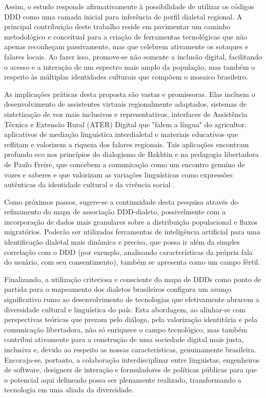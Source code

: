 Assim, o estudo responde afirmativamente à possibilidade de utilizar os códigos DDD como uma camada inicial para inferência de perfil dialetal regional. A principal contribuição deste trabalho reside em pavimentar um caminho metodológico e conceitual para a criação de ferramentas tecnológicas que não apenas reconheçam passivamente, mas que celebrem ativamente os sotaques e falares locais. Ao fazer isso, promove-se não somente a inclusão digital, facilitando o acesso e a interação de um espectro mais amplo da população, mas também o respeito às múltiplas identidades culturais que compõem o mosaico brasileiro.

As implicações práticas desta proposta são vastas e promissoras. Elas incluem o desenvolvimento de assistentes virtuais regionalmente adaptados, sistemas de sintetização de voz mais inclusivos e representativos, interfaces de Assistência Técnica e Extensão Rural (ATER) Digital que "falem a língua" do agricultor, aplicativos de mediação linguística interdialetal e materiais educativos que reflitam e valorizem a riqueza dos falares regionais. Tais aplicações encontram profundo eco nos princípios do dialogismo de Bakhtin e na pedagogia libertadora de Paulo Freire, que concebem a comunicação como um encontro genuíno de vozes e saberes e que valorizam as variações linguísticas como expressões autênticas da identidade cultural e da vivência social \cite{bakhtin1997estetica, freire2005pedagogia, freire2013extensao}.

Como próximos passos, sugere-se a continuidade desta pesquisa através do refinamento do mapa de associação DDD-dialeto, possivelmente com a incorporação de dados mais granulares sobre a distribuição populacional e fluxos migratórios. Poderão ser utilizadas ferramentas de inteligência artificial para uma identificação dialetal mais dinâmica e precisa, que possa ir além da simples correlação com o DDD (por exemplo, analisando características da própria fala do usuário, com seu consentimento), também se apresenta como um campo fértil.

Finalizando, a utilização criteriosa e consciente do mapa de DDDs como ponto de partida para o mapeamento dos dialetos brasileiros configura um avanço significativo rumo ao desenvolvimento de tecnologias que efetivamente abracem a diversidade cultural e linguística do país. Esta abordagem, ao alinhar-se com perspectivas teóricas que prezam pelo diálogo, pela valorização identitária e pela comunicação libertadora, não só enriquece o campo tecnológico, mas também contribui ativamente para a construção de uma sociedade digital mais justa, inclusiva e, devido ao respeito as nossas características, genuinamente brasileira. Encoraja-se, portanto, a colaboração interdisciplinar entre linguistas, engenheiros de software, designers de interação e formuladores de políticas públicas para que o potencial aqui delineado possa ser plenamente realizado, transformando a tecnologia em uma aliada da diversidade.
